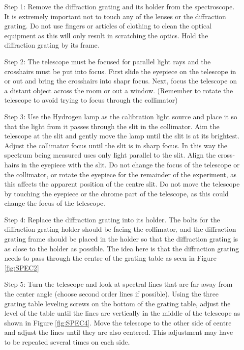 \documentclass[12pt, a4paper, oneside, openright, titlepage]{book}
\begin{document}
\begin{itemize}[leftmargin = 50pt]
    \item[Step 1:] Remove the diffraction grating and its holder from the spectroscope. It is extremely important not to touch any of the lenses or the diffraction grating. Do not use fingers or articles of clothing to clean the optical equipment as this will only result in scratching the optics. Hold the diffraction grating by its frame.
    \item[Step 2:] The telescope must be focused for parallel light rays and the crosshairs must be put into focus. First slide the eyepiece on the telescope in or out and bring the crosshairs into shapr focus. Next, focus the telescope on a distant object across the room or out a window. (Remember to rotate the telescope to avoid trying to focus through the collimator)
    \item[Step 3:] Use the Hydrogen lamp as the calibration light source and place it so that the light from it passes through the slit in the collimator. Aim the telescope at the slit and gently move the lamp until the slit is at its brightest. Adjust the collimator focus until the slit is in sharp focus. In this way the spectrum being measured uses only light parallel to the slit. Align the cross-hairs in the eyepiece with the slit. Do not change the focus of the telescope or the collimator, or rotate the eyepiece for the remainder of the experiment, as this affects the apparent position of the centre slit. Do not move the telescope by touching the eyepiece or the chrome part of the telescope, as this could change the focus of the telescope.
    \item[Step 4:] Replace the diffraction grating into its holder. The bolts for the diffraction grating holder should be facing the collimator, and the diffraction grating frame should be placed in the holder so that the diffraction grating is as close to the holder as possible. The idea here is that the diffraction grating needs to pass through the centre of the grating table as seen in Figure \ref{fig:SPEC2}
    \item[Step 5:] Turn the telescope and look at spectral lines that are far away from the center angle (choose second order lines if possible). Using the three grating table leveling screws on the bottom of the grating table, adjust the level of the table until the lines are vertically in the middle of the telescope as shown in Figure \ref{fig:SPEC4}. Move the telescope to the other side of centre and adjust the lines until they are also centered. This adjustment may have to be repeated several times on each side.


\end{itemize}
\end{document}
